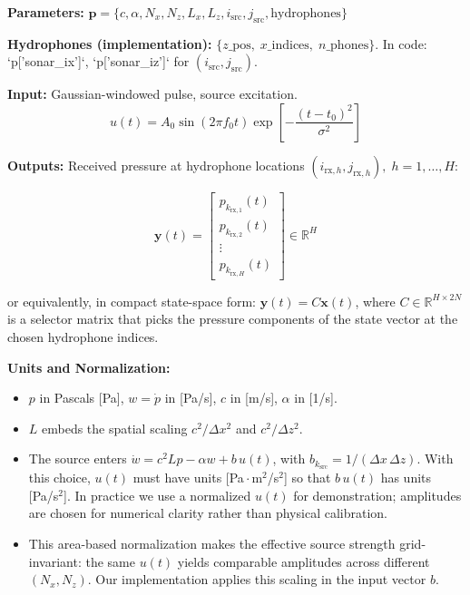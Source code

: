 \documentclass[11pt]{article}
\begin{document}
\textbf{Parameters:}
$\mathbf{p} = \{c, \alpha, N_x, N_z, L_x, L_z, i_\mathrm{src}, j_\mathrm{src}, \text{hydrophones}\}\
$

\textbf{Hydrophones (implementation):} $\{ z\_\mathrm{pos},\; x\_\mathrm{indices},\; n\_\mathrm{phones} \}$. In code: `p['sonar_ix']`, `p['sonar_iz']` for $(i_\mathrm{src}, j_\mathrm{src})$.

\textbf{Input:} Gaussian-windowed pulse, source excitation.
\[
u(t) = A_0 \sin(2\pi f_0 t) \exp\!\left[-\frac{(t-t_0)^2}{\sigma^2}\right]
\]

\textbf{Outputs:} Received pressure at hydrophone locations $(i_{\mathrm{rx},h},j_{\mathrm{rx},h}), \; h=1,\dots,H$:

\[
\mathbf{y}(t) = 
\begin{bmatrix}
p_{k_{\mathrm{rx},1}}(t) \\
p_{k_{\mathrm{rx},2}}(t) \\
\vdots \\
p_{k_{\mathrm{rx},H}}(t)
\end{bmatrix}
\in \mathbb{R}^{H}
\]

or equivalently, in compact state-space form: $\mathbf{y}(t) = C \mathbf{x}(t)$, where $C \in \mathbb{R}^{H \times 2N}$ is a selector matrix that picks the pressure components of the state vector at the chosen hydrophone indices.

\textbf{Units and Normalization:}
\begin{itemize}
    \item $p$ in Pascals [Pa], $w=\dot p$ in [Pa/s], $c$ in [m/s], $\alpha$ in [1/s].
    \item $L$ embeds the spatial scaling $c^2/\Delta x^2$ and $c^2/\Delta z^2$.
    \item The source enters $\dot w = c^2 L p - \alpha w + b\,u(t)$, with $b_{k_\mathrm{src}} = 1/(\Delta x\,\Delta z)$. With this choice, $u(t)$ must have units [Pa\,$\cdot$\,m$^2$/s$^2$] so that $b\,u(t)$ has units [Pa/s$^2$]. In practice we use a normalized $u(t)$ for demonstration; amplitudes are chosen for numerical clarity rather than physical calibration.
    \item This area-based normalization makes the effective source strength grid-invariant: the same $u(t)$ yields comparable amplitudes across different $(N_x,N_z)$. Our implementation applies this scaling in the input vector $b$.
\end{itemize}

\newpage
\end{document}
